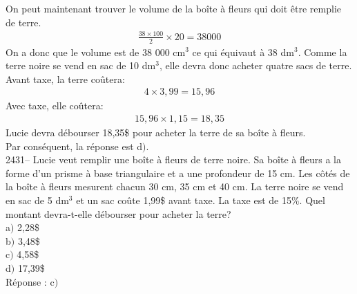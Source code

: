 \documentclass[letterpaper, 12pt]{article}
\begin{document}
On peut maintenant trouver le volume de la bo\^ite \`a fleurs qui doit \^etre remplie de terre.
\begin{eqnarray*}
 \frac{38\times 100}{2}\times 20 = 38000
\end{eqnarray*}
On a donc que le volume  est de 38 000 cm$^{3}$ ce qui \'equivaut \`a 38 dm$^{3}$. Comme la terre noire se vend en sac de 10 dm$^{3}$, elle devra donc acheter quatre sacs de terre. Avant taxe, la terre co\^utera:
\begin{eqnarray*}
  4 \times 3,99 = 15,96
\end{eqnarray*}
Avec taxe, elle co\^utera:
\begin{eqnarray*}
  15,96 \times 1,15 = 18,35
\end{eqnarray*}
Lucie devra d\'ebourser 18,35\$ pour acheter la terre de sa bo\^ite \`a fleurs.\\
Par cons\'equent, la r\'eponse est d$)$.\\

2431-- Lucie veut remplir une bo\^ite \`a fleurs de terre noire. Sa bo\^ite \`a fleurs a la forme d'un prisme \`a base triangulaire et a une profondeur de 15 cm. Les c\^ot\'es de la bo\^ite \`a fleurs mesurent chacun 30 cm, 35 cm et 40 cm. La terre noire se vend en sac de 5 dm$^{3}$ et un sac co\^ute 1,99\$ avant taxe. La taxe est de 15\%. Quel montant devra-t-elle d\'ebourser pour acheter la terre? \\

a$)$ 2,28\$\\
b$)$ 3,48\$\\
c$)$ 4,58\$\\
d$)$ 17,39\$\\


R\'eponse : c$)$\\
\end{document}
